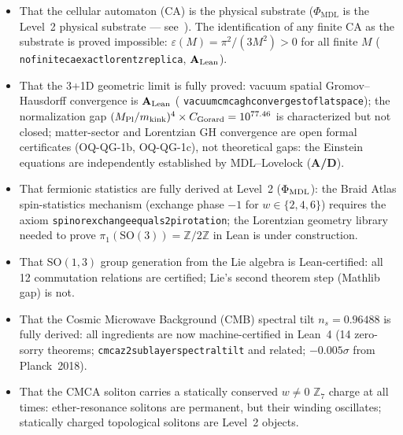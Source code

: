\documentclass[11pt]{article}
\theoremstyle{remark}
\newcommand{\PHIMDL}{\Phi_{\mathrm{MDL}}}
\newcommand{\ZS}{\mathbb{Z}_7}
\newcommand{\lean}[1]{%
  \penalty-100
  \begingroup\def\_{\textunderscore\allowbreak}\texttt{#1}\endgroup}
\newcommand{\CatAL}{\ensuremath{\textbf{A}_{\rm Lean}}}
\newcommand{\CatAD}{\textbf{A/D}}
\newcommand{\CMCA}{\text{CMCA}}
\begin{document}
\begin{tcolorbox}[colback=blue!5,colframe=blue!40!black,
  title={\textbf{What this paper does NOT claim}},
  fonttitle=\bfseries,left=6pt,right=6pt,top=5pt,bottom=5pt,breakable]
\small
\begin{itemize}[noitemsep,topsep=2pt]
  \item That the cellular automaton (CA) is the physical substrate ($\PHIMDL$ is
        the Level~2 physical substrate --- see~\cite{SpivackCompleteness,SpivackQGR}).
        The identification of any finite CA as the substrate is proved impossible:
        $\varepsilon(M) = \pi^2/(3M^2)>0$ for all finite $M$
        (\lean{no\_finite\_ca\_exact\_lorentz\_replica}, $\CatAL$).
  \item That the 3+1D geometric limit is fully proved: vacuum spatial
        Gromov--Hausdorff convergence is \CatAL{}
        (\lean{vacuum\_cmca\_gh\_converges\_to\_flat\_space}); the normalization gap
        $(M_{\rm Pl}/m_{\rm kink})^4 \times C_{\rm Gorard} = 10^{77.46}$ is
        characterized but not closed;         matter-sector and Lorentzian GH convergence
        are open formal certificates (OQ-QG-1b, OQ-QG-1c), not theoretical gaps:
        the Einstein equations are independently established by MDL--Lovelock (\CatAD).
  \item That fermionic statistics are fully derived at Level~2 ($\Phi_{\rm MDL}$):
        the Braid Atlas spin-statistics mechanism (exchange phase $-1$ for $w\in\{2,4,6\}$)
        requires the axiom \lean{spinor\_exchange\_equals\_2pi\_rotation}; the Lorentzian
        geometry library needed to prove $\pi_1(\mathrm{SO}(3))=\mathbb{Z}/2\mathbb{Z}$ in
        Lean is under construction.
  \item That SO$(1,3)$ group generation from the Lie algebra is Lean-certified:
        all 12 commutation relations are certified; Lie's second theorem step
        (Mathlib gap) is not.
  \item That the Cosmic Microwave Background (CMB) spectral tilt $n_s = 0.96488$ is fully derived:
        all ingredients are now machine-certified in Lean~4 (14 zero-sorry
        theorems; \lean{cmca\_z2\_sublayer\allowbreak\_spectral\_tilt} and related;
        $-0.005\sigma$ from Planck~2018).
  \item That the $\CMCA$ soliton carries a statically conserved $w\neq 0$ $\ZS$
        charge at all times: ether-resonance solitons are permanent, but their
        winding oscillates; statically charged topological solitons are Level~2
        objects.
\end{itemize}
\end{tcolorbox}
\end{document}
